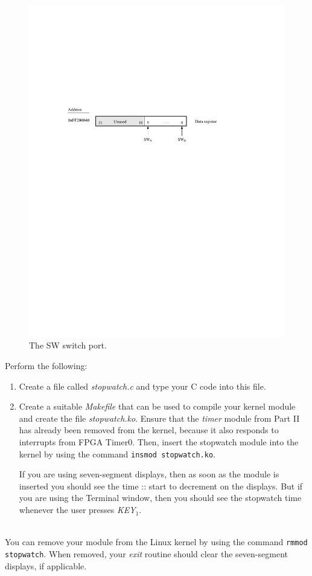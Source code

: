 \documentclass[epsfig,10pt,fullpage]{article}
\newcommand{\CommonDocsPath}{../../common/docs}
\begin{document}
\begin{figure}[H]
   \begin{center}
       \includegraphics{figures/fig_slider_port.pdf}
   \end{center}
	\caption{The SW switch port.}
\label{fig:slider}
\end{figure}

\noindent
Perform the following:

\begin{enumerate}
\item Create a file called {\it stopwatch.c} and type your C code into this file.

\item
Create a suitable {\it Makefile} that can be used to compile your kernel module and create the 
file {\it stopwatch.ko}. Ensure that the {\it timer} module from Part II has already been 
removed from the kernel, because it also responds to interrupts from FPGA Timer0. Then, 
insert the stopwatch module into the kernel by using the 
command \texttt{insmod stopwatch.ko}. 

If you are using seven-segment displays, then as soon as the module is inserted you should 
see the time :: start to decrement on the displays. But if you are
using the Terminal window, then you should see the stopwatch time whenever the user presses
{\it KEY}$_1$.
\end{enumerate}

~\\
\noindent
You can remove your module from the Linux kernel by using the command 
\texttt{rmmod stopwatch}. When removed, your {\it exit} routine should clear the seven-segment
displays, if applicable.
\vskip 0.8in
\noindent
\newpage

\end{document}
